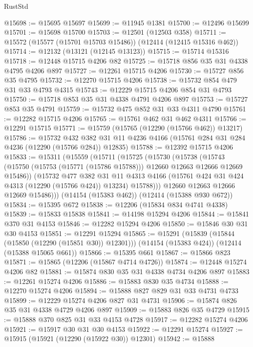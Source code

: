 \begin{lexlean}{RustStd}
\begin{coremodule}
@15698 := @15695 @15697
@15699 := @11945 @1381
@15700 := @12496 @15699
@15701 := @15698 @15700
@15703 := @12501 (@12503 @358)
@15711 := @15572 (@15577 (@15701 @15703 @15486)) (@12414 (@12415 @15316 @462))
@15714 := @12132 (@13121 (@12145 @13123))
@15715 := @15714 @15316
@15718 := @12448 @15715 @4206 @82
@15725 := @15718 @856 @35 @31 @4338 @4795 @4206 @897
@15727 := @12261 @15715 @4206
@15730 := @15727 @856 @35 @4795
@15732 := @12270 @15715 @4206
@15738 := @15732 @854 @479 @31 @33 @4793 @4315
@15743 := @12229 @15715 @4206 @854 @31 @4793
@15750 := @15718 @853 @35 @31 @4338 @4791 @4206 @897
@15753 := @15727 @853 @35 @4791
@15759 := @15732 @475 @852 @31 @33 @4311 @4790
@15761 := @12282 @15715 @4206
@15765 := @15761 @462 @31 @462 @4311
@15766 := @12291 @15715
@15771 := @15759 (@15765 (@12290 (@15766 @462)) @13217)
@15786 := @15732
    @432
    @382
    @31
    @11
    @4236
    @4166
    (@15761 @284 @31 @284 @4236 (@12290 (@15766 @284)) @12835)
@15788 := @12392 @15715 @4206
@15833 := @15311
    (@15559
      (@15711
        (@15725
          (@15730
            (@15738
              (@15743 (@15750 (@15753 (@15771 (@15786 @15788))) @12660 @12663 @12666 @12669 @15486))
              (@15732
                @477
                @382
                @31
                @11
                @4313
                @4166
                (@15761 @424 @31 @424 @4313 (@12290 (@15766 @424)) @13234)
                @15788)))
          @12660
          @12663
          @12666
          @12669
          @15486)))
    (@14154 (@15383 @462))
    (@12414 (@15388 @930 @672))
@15834 := @15395 @672
@15838 := @12206 (@15834 @834 @4741 @4338)
@15839 := @15833 @15838
@15841 := @14198 @15294 @4206
@15844 := @15841 @370 @31 @4153
@15846 := @12282 @15294 @4206
@15850 := @15846 @30 @31 @30 @4153
@15851 := @12291 @15294
@15865 := @15291
    (@15839 (@15844 (@15850 (@12290 (@15851 @30)) @12301)))
    (@14154 (@15383 @424))
    (@12414 (@15388 @15065 @661))
@15866 := @15395 @661
@15867 := @15866 @823
@15871 := @15865 (@12206 (@15867 @4714 @4726))
@15874 := @12448 @15274 @4206 @82
@15881 := @15874 @830 @35 @31 @4338 @4734 @4206 @897
@15883 := @12261 @15274 @4206
@15886 := @15883 @830 @35 @4734
@15888 := @12270 @15274 @4206
@15894 := @15888 @827 @829 @31 @33 @4731 @4733
@15899 := @12229 @15274 @4206 @827 @31 @4731
@15906 := @15874 @826 @35 @31 @4338 @4729 @4206 @897
@15909 := @15883 @826 @35 @4729
@15915 := @15888 @370 @825 @31 @33 @4153 @4728
@15917 := @12282 @15274 @4206
@15921 := @15917 @30 @31 @30 @4153
@15922 := @12291 @15274
@15927 := @15915 (@15921 (@12290 (@15922 @30)) @12301)
@15942 := @15888

\end{coremodule}
\end{lexlean}

